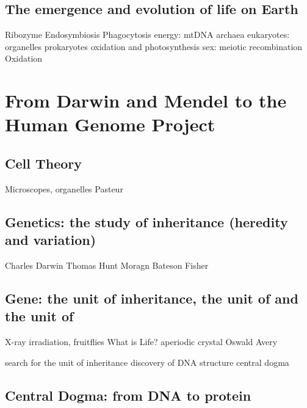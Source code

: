 \subsection{The emergence and evolution of life on Earth}

Ribozyme
Endosymbiosis
Phagocytosis
energy: mtDNA
archaea
eukaryotes: organelles
prokaryotes
oxidation and photosynthesis
sex: meiotic recombination
Oxidation

\section{From Darwin and Mendel to the Human Genome Project}

\subsection{Cell Theory}

Microscopes, organelles
Pasteur


\subsection{Genetics: the study of inheritance (heredity and variation)}
Charles Darwin
Thomas Hunt Moragn
Bateson
Fisher



\subsection{Gene: the unit of inheritance, the unit of and the unit of }

X-ray irradiation, fruitflies
What is Life? aperiodic crystal
Oswald Avery

search for the unit of inheritance
discovery of DNA structure
central dogma

\subsection{Central Dogma: from DNA to protein}

